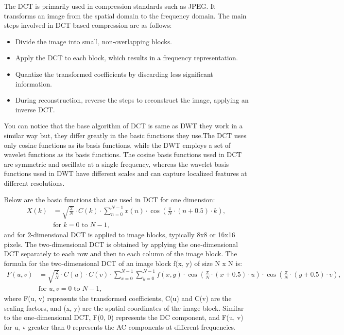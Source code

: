 \documentclass{article}
\begin{document}
\setlength{\parindent}{1cm}
The DCT is primarily used in compression standards such as JPEG. It transforms an image from the spatial domain to the frequency domain. The main steps involved in DCT-based compression are as follows:
\begin{itemize}
    \item Divide the image into small, non-overlapping blocks.
    \item Apply the DCT to each block, which results in a frequency representation.
    \item Quantize the transformed coefficients by discarding less significant information.  
    \item During reconstruction, reverse the steps to reconstruct the image, applying an inverse DCT.
\end{itemize}

You can notice that the base algorithm of DCT is same as DWT they work in a similar way but, they differ greatly in the basic functions they use.The DCT uses only cosine functions as its basis functions, while the DWT employs a set of wavelet functions as its basis functions. The cosine basis functions used in DCT are symmetric and oscillate at a single frequency, whereas the wavelet basis functions used in DWT have different scales and can capture localized features at different resolutions.

Below are the basic functions that are used in DCT for one dimension:
    \begin{align*}
    X(k) &= \sqrt{\frac{2}{N}} \cdot C(k) \cdot \sum_{n=0}^{N-1} x(n) \cdot \cos\left(\frac{\pi}{N} \cdot (n + 0.5) \cdot k\right), \\
    &\text{for } k = 0 \text{ to } N-1,
    \end{align*}
and for 2-dimensional DCT is applied to image blocks, typically 8x8 or 16x16 pixels. The two-dimensional DCT is obtained by applying the one-dimensional DCT separately to each row and then to each column of the image block.
The formula for the two-dimensional DCT of an image block f(x, y) of size N x N is:
    \begin{align*}
    F(u, v) &= \sqrt{\frac{2}{N}} \cdot C(u) \cdot C(v) \cdot \sum_{x=0}^{N-1} \sum_{y=0}^{N-1} f(x, y) \cdot \cos\left(\frac{\pi}{N} \cdot (x + 0.5) \cdot u\right) \cdot \cos\left(\frac{\pi}{N} \cdot (y + 0.5) \cdot v\right), \\
    &\text{for } u, v = 0 \text{ to } N-1,
    \end{align*}
    where F(u, v) represents the transformed coefficients, C(u) and C(v) are the scaling factors, and (x, y) are the spatial coordinates of the image block.
    Similar to the one-dimensional DCT, F(0, 0) represents the DC component, and F(u, v) for u, v greater than 0 represents the AC components at different frequencies.
\end{document}
